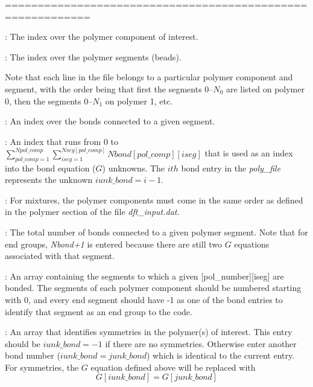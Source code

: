 \documentclass[10pt,onecolumn]{article}
\begin{document}
\noindent===========================================================
\vspace{0.1in}


\vspace{0.1in}
: The index over the polymer component of interest.

\vspace{0.1in}
: The index over the polymer segments (beads).

\vspace{0.1in}
\noindent Note that each line in the file belongs to a particular polymer component and segment, with the order being that first the segments 0--$N_0$ are listed on polymer 0, then the segments 0--$N_1$ on polymer 1, etc.

\vspace{0.1in}
: An index over the bonds connected to a given segment.

\vspace{0.1in}
: An index that runs from 0 to
$\sum_{pol\_comp=1}^{Npol\_comp} \sum_{iseg=1}^{Nseg[pol\_comp]} Nbond[pol\_comp][iseg]$
that is used as an index into the bond equation ($G$) unknowns.  The $ith$
bond entry in the {\it poly\_file} represents the unknown $iunk\_bond = i-1$.

\vspace{0.1in}
:  For
mixtures, the polymer components must come in the same order as
defined in the polymer section of the file {\it dft\_input.dat}. 

\vspace{0.1in}
: The total number of bonds connected to a given polymer segment.  Note that for end groups, {\it Nbond+1} is entered
because there are still two $G$ equations associated with that segment.


\vspace{0.1in}
:
An array containing the segments to which a given [pol\_number][iseg] are bonded.
The segments of each polymer component should be numbered starting with 0,
and every end segment should have -1 as one of the bond entries to identify
that segment as an end group to the code.

\vspace{0.1in}
:  An array that identifies symmetries in
the polymer(s) of interest.  This entry should be $iunk\_bond=-1$ if there are no
symmetries.  Otherwise enter another bond number ($iunk\_bond=junk\_bond$)
which is identical to the current entry.  For symmetries, the $G$ equation defined
above will be replaced with
%
\begin{equation}
G[iunk\_bond]=G[junk\_bond]
\end{equation}
%
%
\vfill
\break
%
\end{document}
